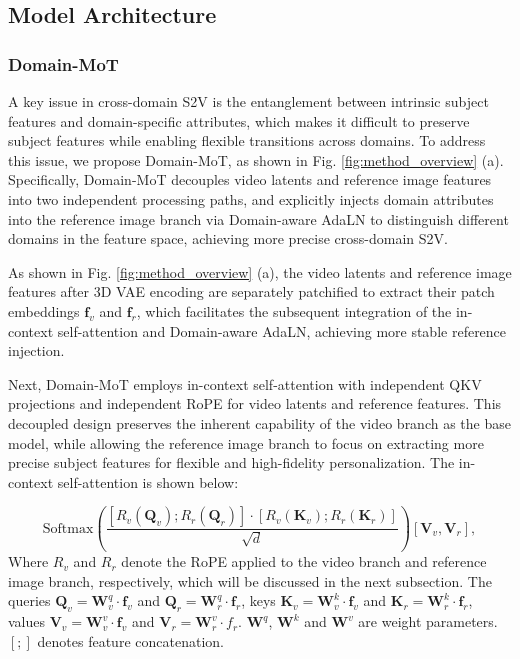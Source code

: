 \subsection{Model Architecture} 
\subsubsection{Domain-MoT}


A key issue in cross-domain S2V is the entanglement between intrinsic subject features and domain-specific attributes, which makes it difficult to preserve subject features while enabling flexible transitions across domains. To address this issue, we propose Domain-MoT, as shown in Fig. \ref{fig:method_overview} (a). Specifically, Domain-MoT decouples video latents and reference image features into two independent processing paths, and explicitly injects domain attributes into the reference image branch via Domain-aware AdaLN to distinguish different domains in the feature space, achieving more precise cross-domain S2V.

As shown in Fig. \ref{fig:method_overview} (a), the video latents and reference image features after 3D VAE encoding are separately patchified to extract their patch embeddings $\boldsymbol{f}_v$ and $\boldsymbol{f}_r$, which facilitates the subsequent integration of the in-context self-attention and Domain-aware AdaLN, achieving more stable reference injection.

Next, Domain-MoT employs in-context self-attention with independent QKV projections and independent RoPE for video latents and reference features. This decoupled design preserves the inherent capability of the video branch as the base model, while allowing the reference image branch to focus on extracting more precise subject features for flexible and high-fidelity personalization. The in-context self-attention is shown below:


\begin{equation}
\label{eq:attention}
 \text{Softmax}\left( \frac{ [ R_{v}(  \boldsymbol{Q}_{v}); R_{r}(\boldsymbol{Q}_{r})] \cdot [ R_{v}(  \boldsymbol{K}_{v}); R_{r}(\boldsymbol{K}_{r})]}{\sqrt{d}} \right)  [\boldsymbol{V}_{v},\boldsymbol{V}_{r}], 
\end{equation}
Where $ R_{v}$ and $ R_{r}$ denote the RoPE applied to the video branch and reference image branch, respectively, which will be discussed in the next subsection. The queries $\boldsymbol{Q}_v=\boldsymbol{W}^q_v\cdot \boldsymbol{f}_v$ and $\boldsymbol{Q}_r=\boldsymbol{W}^q_r \cdot \boldsymbol{f}_r$,  keys  $\boldsymbol{K}_v=\boldsymbol{W}^k_v \cdot \boldsymbol{f}_v$ and $\boldsymbol{K}_r=\boldsymbol{W}^k_r \cdot \boldsymbol{f}_r$, values $\boldsymbol{V}_v=\boldsymbol{W}_v^v \cdot \boldsymbol{f}_v$ and $\boldsymbol{V}_r=\boldsymbol{W}^v_r \cdot f_r$. $\boldsymbol{W}^q$,  $\boldsymbol{W}^k$ and $\boldsymbol{W}^v$ are weight parameters. \( [; ] \) denotes feature concatenation. %


